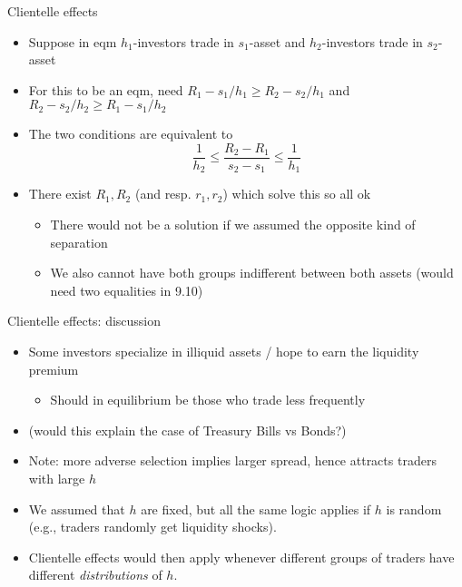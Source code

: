 \documentclass[english,10pt
,aspectratio=169
]{beamer}
\begin{document}
\begin{frame}{Clientelle effects}
	\begin{itemize}
		\item Suppose in eqm $h_1$-investors trade in $s_1$-asset and $h_2$-investors trade in $s_2$-asset
		\item For this to be an eqm, need $R_1 - s_1/h_1 \geq R_2 - s_2/h_1$ and $R_2 - s_2/h_2 \geq R_1 - s_1/h_2$
		\item The two conditions are equivalent to
		\begin{equation}\tag{9.10}
			\frac{1}{h_2} \leq \frac{R_2 - R_1}{s_2 - s_1} \leq \frac{1}{h_1}
		\end{equation}
		\pause 
		\item There exist $R_1,R_2$ (and resp. $r_1,r_2$) which solve this so all ok
		\begin{itemize}
			\item There would not be a solution if we assumed the opposite kind of separation
			\item We also cannot have both groups indifferent between both assets (would need two equalities in 9.10)
		\end{itemize}
	\end{itemize}
\end{frame}


\begin{frame}{Clientelle effects: discussion}
	\begin{itemize}
		\item Some investors specialize in illiquid assets / hope to earn the liquidity premium
		\begin{itemize}
			\item Should in equilibrium be those who trade less frequently
		\end{itemize}
		\item (would this explain the case of Treasury Bills vs Bonds?) 
		\item Note: more adverse selection implies larger spread, hence attracts traders with large $h$
		\pause\bigskip 
		\item We assumed that $h$ are fixed, but all the same logic applies if $h$ is random (e.g., traders randomly get liquidity shocks).
		\item Clientelle effects would then apply whenever different groups of traders have different \emph{distributions} of $h$.
	\end{itemize}
\end{frame}
\end{document}
